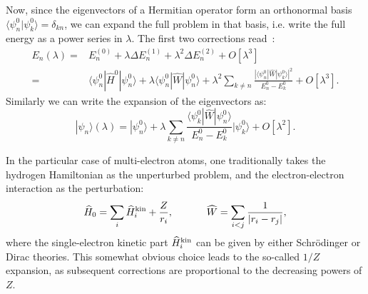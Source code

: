 Now, since the eigenvectors of a Hermitian operator form an orthonormal basis $\langle \psi^0_n|\psi^0_k\rangle = \delta_{kn}$, we can expand the full problem in that basis, i.e. write the full energy as a power series in $\lambda$. The first two corrections read~\cite{19263840404}: 
\begin{align} \label{PertSeries}
	E_n(\lambda) =& E^{(0)}_n + \lambda \Delta E^{(1)}_n + \lambda^2 \Delta E^{(2)}_n + O[\lambda^3] \nonumber \\
	 =& \langle \psi_n^0 |\widehat{H}^0|\psi_n^0\rangle + \lambda \langle \psi^0_n|\widehat{W}|\psi^0_n\rangle+\lambda^2 \sum_{k \neq n} \frac{|\langle \psi^0_n|\widehat{W}|\psi^0_k\rangle|^2}{E^0_n-E^0_k} + O[\lambda^3].
\end{align}
Similarly we can write the expansion of the eigenvectors as:
\begin{equation}
	|\psi_n\rangle (\lambda) = |\psi^0_n\rangle + \lambda  \sum_{k \neq n} \frac{\langle \psi^0_k|\widehat{W}|\psi^0_n\rangle}{E^0_n-E^0_k} |\psi^0_k\rangle + O[\lambda^2].
\end{equation}

In the particular case of multi-electron atoms, one traditionally takes the hydrogen Hamiltonian as the unperturbed problem, and the electron-electron interaction as the perturbation:
\begin{equation}
	\widehat{H}_0 = \sum_i \widehat{H}^{\rm{kin}}_i + \frac{Z}{r_i},~~~~~~~~~~\widehat{W} = \sum_{i<j} \frac{1}{|r_i-r_j|},
\end{equation}
where the single-electron kinetic part $\widehat{H}^{\rm{kin}}_i$ can be given by either Schr\"odinger or Dirac theories. This somewhat obvious choice leads to the so-called $1/Z$ expansion, as subsequent corrections are proportional to the decreasing powers of $Z$.


